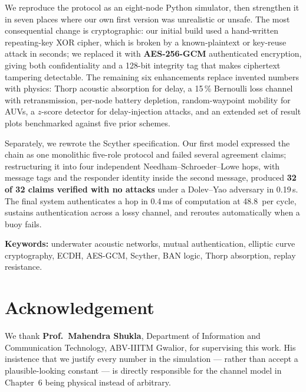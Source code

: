 \vspace{2mm}\noindent
We reproduce the protocol as an eight-node Python simulator, then strengthen it in seven
places where our own first version was unrealistic or unsafe. The most consequential change
is cryptographic: our initial build used a hand-written repeating-key XOR cipher, which is
broken by a known-plaintext or key-reuse attack in seconds; we replaced it with
\textbf{AES-256-GCM} authenticated encryption, giving both confidentiality and a 128-bit
integrity tag that makes ciphertext tampering detectable. The remaining six enhancements
replace invented numbers with physics: Thorp acoustic absorption for delay, a 15\,\%
Bernoulli loss channel with retransmission, per-node battery depletion, random-waypoint
mobility for AUVs, a $z$-score detector for delay-injection attacks, and an extended set of
result plots benchmarked against five prior schemes.

\vspace{2mm}\noindent
Separately, we rewrote the Scyther specification. Our first model expressed the chain as one
monolithic five-role protocol and failed several agreement claims; restructuring it into
four independent Needham--Schroeder--Lowe hops, with message tags and the responder identity
inside the second message, produced \textbf{32 of 32 claims verified with no attacks} under
a Dolev--Yao adversary in 0.19\,s. The final system authenticates a hop in 0.4\,ms of
computation at 48.8\,\uJ{} per cycle, sustains authentication across a lossy channel, and
reroutes automatically when a buoy fails.

\vspace{4mm}\noindent
\textbf{Keywords:} underwater acoustic networks, mutual authentication, elliptic curve
cryptography, ECDH, AES-GCM, Scyther, BAN logic, Thorp absorption, replay resistance.

\chapter*{Acknowledgement}
\thispagestyle{plain}

\noindent
We thank \textbf{Prof.\ Mahendra Shukla}, Department of Information and Communication
Technology, ABV-IIITM Gwalior, for supervising this work. His insistence that we justify
every number in the simulation --- rather than accept a plausible-looking constant --- is
directly responsible for the channel model in Chapter~6 being physical instead of arbitrary.

